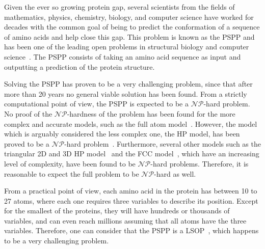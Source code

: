 Given the ever so growing protein gap, several scientists from the fields of
mathematics, physics, chemistry, biology, and computer science have worked for
decades with the common goal of being to predict the conformation of a sequence
of amino acids and help close this gap. This problem is known as the
\acf{PSPP} and has been one of the leading open problems
in structural biology and computer science~\cite{dorn2014three}. The \ac{PSPP} consists of
taking an amino acid sequence as input and outputting a prediction of the protein structure.

Solving the \ac{PSPP} has proven to be a very challenging problem, since that
after more than 20 years no general viable solution has been found. From a
strictly computational point of view, the \ac{PSPP} is expected to be a
$\mathcal{NP}$-hard problem. No proof of the $\mathcal{NP}$-hardness of the
problem has been found for the more complex and accurate models, such as the
full atom model~\cite{rohl2004protein}. However, the model which is arguably
considered the less complex one, the \ac{HP} model, has been proved to be a
$\mathcal{NP}$-hard problem~\cite{berger1998protein}. Furthermore, several
other models such as the triangular 2D and 3D \ac{HP}
model~\cite{agarwala1997local} and the \ac{FCC} model~\cite{hoque2007protein},
which have an increasing level of complexity, have been found to be
$\mathcal{NP}$-hard problems.  Therefore, it is reasonable to expect the full
problem to be $\mathcal{NP}$-hard as well.

From a practical point of view, each amino acid in the protein has between 10
to 27 atoms, where each one requires three variables to describe its position.
Except for the smallest of the proteins, they will have hundreds or thousands
of variables, and can even reach millions assuming that all atoms have the
three variables. Therefore, one can consider that the \ac{PSPP} is a
\ac{LSOP}~\cite{mahdavi2015metaheuristics}, which happens to be a very
challenging problem.


